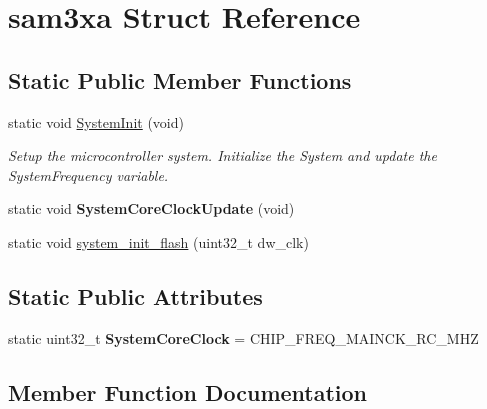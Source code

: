 \hypertarget{structsam3xa}{}\section{sam3xa Struct Reference}
\label{structsam3xa}
\subsection*{Static Public Member Functions}
\begin{DoxyCompactItemize}
\item 
static void \hyperlink{structsam3xa_a5c64fdd7a44e7283a371095eb5006822}{System\+Init} (void)\hypertarget{structsam3xa_a5c64fdd7a44e7283a371095eb5006822}{}\label{structsam3xa_a5c64fdd7a44e7283a371095eb5006822}

\begin{DoxyCompactList}\small\item\em Setup the microcontroller system. Initialize the System and update the System\+Frequency variable. \end{DoxyCompactList}\item 
static void {\bfseries System\+Core\+Clock\+Update} (void)\hypertarget{structsam3xa_a706dfb7f27503c306abec713add9fe01}{}\label{structsam3xa_a706dfb7f27503c306abec713add9fe01}

\item 
static void \hyperlink{structsam3xa_a2145370cebb05a883057a5591ab69b47}{system\+\_\+init\+\_\+flash} (uint32\+\_\+t dw\+\_\+clk)
\end{DoxyCompactItemize}
\subsection*{Static Public Attributes}
\begin{DoxyCompactItemize}
\item 
static uint32\+\_\+t {\bfseries System\+Core\+Clock} = C\+H\+I\+P\+\_\+\+F\+R\+E\+Q\+\_\+\+M\+A\+I\+N\+C\+K\+\_\+\+R\+C\+\_\+M\+HZ\hypertarget{structsam3xa_abe7d91288a97f62ac2101fbfa0d6e3cc}{}\label{structsam3xa_abe7d91288a97f62ac2101fbfa0d6e3cc}

\end{DoxyCompactItemize}


\subsection{Member Function Documentation}
